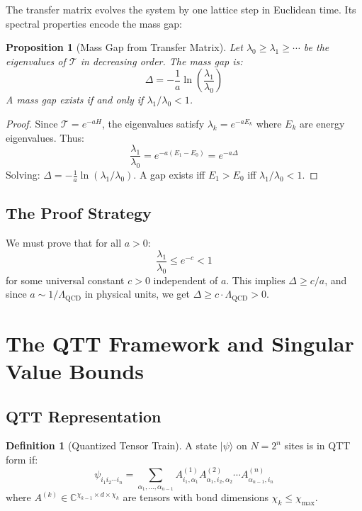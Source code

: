 \documentclass[12pt,a4paper]{article}
\theoremstyle{plain}
\newtheorem{proposition}[theorem]{Proposition}
\theoremstyle{definition}
\newtheorem{definition}[theorem]{Definition}
\theoremstyle{remark}
\newcommand{\QCD}{\Lambda_{\mathrm{QCD}}}
\newcommand{\cT}{\mathcal{T}}
\newcommand{\bC}{\mathbb{C}}
\newcommand{\ket}[1]{|#1\rangle}
\begin{document}
The transfer matrix evolves the system by one lattice step in Euclidean time. Its spectral properties encode the mass gap:

\begin{proposition}[Mass Gap from Transfer Matrix]
\label{prop:gap-transfer}
Let $\lambda_0 \geq \lambda_1 \geq \cdots$ be the eigenvalues of $\cT$ in decreasing order. The mass gap is:
\begin{equation}
    \Delta = -\frac{1}{a}\ln\left(\frac{\lambda_1}{\lambda_0}\right)
\end{equation}
A mass gap exists if and only if $\lambda_1/\lambda_0 < 1$.
\end{proposition}

\begin{proof}
Since $\cT = e^{-aH}$, the eigenvalues satisfy $\lambda_k = e^{-aE_k}$ where $E_k$ are energy eigenvalues. Thus:
\[
\frac{\lambda_1}{\lambda_0} = e^{-a(E_1 - E_0)} = e^{-a\Delta}
\]
Solving: $\Delta = -\frac{1}{a}\ln(\lambda_1/\lambda_0)$. A gap exists iff $E_1 > E_0$ iff $\lambda_1/\lambda_0 < 1$.
\end{proof}

\subsection{The Proof Strategy}

We must prove that for all $a > 0$:
\begin{equation}
    \boxed{\frac{\lambda_1}{\lambda_0} \leq e^{-c} < 1}
\end{equation}
for some universal constant $c > 0$ independent of $a$. This implies $\Delta \geq c/a$, and since $a \sim 1/\QCD$ in physical units, we get $\Delta \geq c \cdot \QCD > 0$.

\section{The QTT Framework and Singular Value Bounds}

\subsection{QTT Representation}

\begin{definition}[Quantized Tensor Train]
A state $\ket{\psi}$ on $N = 2^n$ sites is in QTT form if:
\begin{equation}
    \psi_{i_1 i_2 \cdots i_n} = \sum_{\alpha_1, \ldots, \alpha_{n-1}} A^{(1)}_{i_1, \alpha_1} A^{(2)}_{\alpha_1, i_2, \alpha_2} \cdots A^{(n)}_{\alpha_{n-1}, i_n}
\end{equation}
where $A^{(k)} \in \bC^{\chi_{k-1} \times d \times \chi_k}$ are tensors with bond dimensions $\chi_k \leq \chi_{\max}$.
\end{definition}
\end{document}
